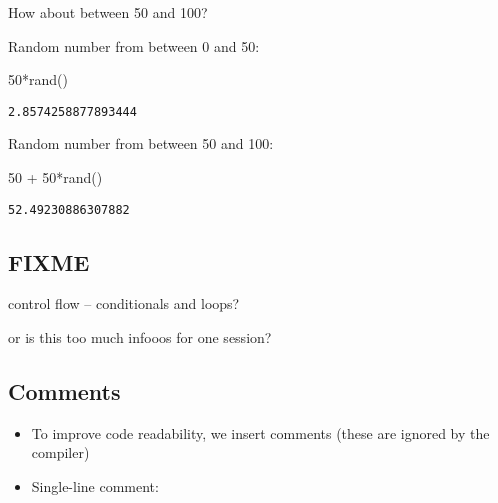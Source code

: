 \documentclass[
  letterpaper,
  DIV=11,
  numbers=noendperiod]{scrartcl}
\newenvironment{Shaded}{\begin{snugshade}}{\end{snugshade}}
\newcommand{\FloatTok}[1]{\textcolor[rgb]{0.68,0.00,0.00}{#1}}
\newcommand{\FunctionTok}[1]{\textcolor[rgb]{0.28,0.35,0.67}{#1}}
\newcommand{\NormalTok}[1]{\textcolor[rgb]{0.00,0.23,0.31}{#1}}
\newcommand{\OperatorTok}[1]{\textcolor[rgb]{0.37,0.37,0.37}{#1}}
\providecommand{\tightlist}{%
  \setlength{\itemsep}{0pt}\setlength{\parskip}{0pt}}\usepackage{longtable,booktabs,array}
\begin{document}
How about between 50 and 100?

\begin{tcolorbox}[enhanced jigsaw, left=2mm, colbacktitle=quarto-callout-tip-color!10!white, titlerule=0mm, breakable, arc=.35mm, opacitybacktitle=0.6, coltitle=black, opacityback=0, toprule=.15mm, bottomrule=.15mm, colframe=quarto-callout-tip-color-frame, bottomtitle=1mm, rightrule=.15mm, leftrule=.75mm, colback=white, toptitle=1mm, title=\textcolor{quarto-callout-tip-color}{\faLightbulb}\hspace{0.5em}{Answer}]

Random number from between 0 and 50:

\begin{Shaded}
\begin{Highlighting}[]
\FloatTok{50}\FunctionTok{*rand}\NormalTok{()}
\end{Highlighting}
\end{Shaded}

\begin{verbatim}
2.8574258877893444
\end{verbatim}

Random number from between 50 and 100:

\begin{Shaded}
\begin{Highlighting}[]
\FloatTok{50} \OperatorTok{+} \FloatTok{50}\FunctionTok{*rand}\NormalTok{()}
\end{Highlighting}
\end{Shaded}

\begin{verbatim}
52.49230886307882
\end{verbatim}

\end{tcolorbox}

\subsection{FIXME}\label{fixme}

control flow -- conditionals and loops?

or is this too much infooos for one session?

\subsection{Comments}\label{comments}

\begin{itemize}
\tightlist
\item
  To improve code readability, we insert comments (these are ignored by
  the compiler)
\item
  Single-line comment:
\end{itemize}
\end{document}
